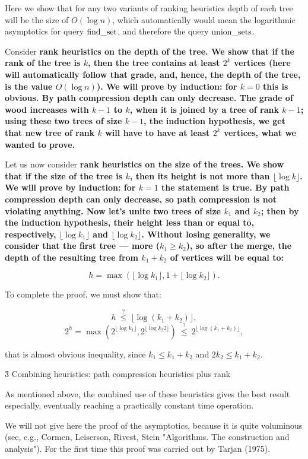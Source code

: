 Here we show that for any two variants of ranking heuristics depth of each tree will be the size of $O (\log n)$, which automatically would mean the logarithmic asymptotics for query $\rm find\_set$, and therefore the query $\rm union\_sets$.

Consider \bf{rank heuristics on the depth of the tree}. We show that if the rank of the tree is $k$, then the tree contains at least $2^k$ vertices (here will automatically follow that grade, and, hence, the depth of the tree, is the value $O(\log n)$). We will prove by induction: for $k=0$ this is obvious. By path compression depth can only decrease. The grade of wood increases with $k-1$ to $k$, when it is joined by a tree of rank $k-1$; using these two trees of size $k-1$, the induction hypothesis, we get that new tree of rank $k$ will have to have at least $2^k$ vertices, what we wanted to prove.

Let us now consider \bf{rank heuristics on the size of the trees}. We show that if the size of the tree is $k$, then its height is not more than $\lfloor \log k \rfloor$. We will prove by induction: for $k=1$ the statement is true. By path compression depth can only decrease, so path compression is not violating anything. Now let's unite two trees of size $k_1$ and $k_2$; then by the induction hypothesis, their height less than or equal to, respectively, $\lfloor \log k_1 \rfloor$ and $\lfloor \log k_2 \rfloor$. Without losing generality, we consider that the first tree --- more ($k_1 \ge k_2$), so after the merge, the depth of the resulting tree from $k_1+k_2$ of vertices will be equal to:

$$ h = \max ( \lfloor \log k_1 \rfloor, 1 + \lfloor \log k_2 \rfloor ). $$

To complete the proof, we must show that:

$$ h ~ \stackrel{?}{\le} ~ \lfloor \log (k_1+k_2) \rfloor, $$
$$ 2^h = \max ( 2 ^ {\lfloor \log k_1 \rfloor}, 2 ^ {\lfloor \log k_2 2 \rfloor} ) ~ \stackrel{?}{\le} ~ 2 ^ {\lfloor \log (k_1+k_2) \rfloor}, $$

that is almost obvious inequality, since $k_1 \le k_1+k_2$ and $2 k_2 \le k_1+k_2$.



\h3{ Combining heuristics: path compression heuristics plus rank }

As mentioned above, the combined use of these heuristics gives the best result especially, eventually reaching a practically constant time operation.

We will not give here the proof of the asymptotics, because it is quite voluminous (see, e.g., Cormen, Leiserson, Rivest, Stein "Algorithms. The construction and analysis"). For the first time this proof was carried out by Tarjan (1975).

